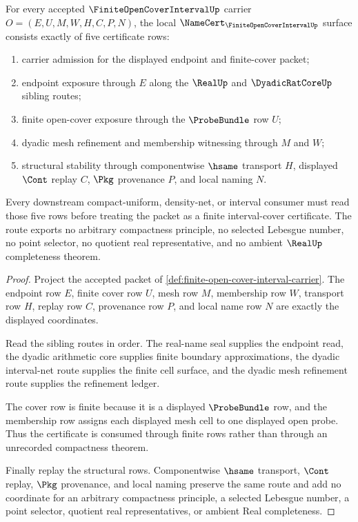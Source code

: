 \begin{theorem}
\label{thm:finite-open-cover-interval-obligations}
For every accepted $\FiniteOpenCoverIntervalUp$ carrier $O=(E,U,M,W,H,C,P,N)$, the local $\NameCert_{\FiniteOpenCoverIntervalUp}$ surface consists exactly of five certificate rows:
\begin{enumerate}
\item carrier admission for the displayed endpoint and finite-cover packet;
\item endpoint exposure through $E$ along the $\RealUp$ and $\DyadicRatCoreUp$ sibling routes;
\item finite open-cover exposure through the $\ProbeBundle$ row $U$;
\item dyadic mesh refinement and membership witnessing through $M$ and $W$;
\item structural stability through componentwise $\hsame$ transport $H$, displayed $\Cont$ replay $C$, $\Pkg$ provenance $P$, and local naming $N$.
\end{enumerate}
Every downstream compact-uniform, density-net, or interval consumer must read those five rows before treating the packet as a finite interval-cover certificate. The route exports no arbitrary compactness principle, no selected Lebesgue number, no point selector, no quotient real representative, and no ambient $\RealUp$ completeness theorem.
\end{theorem}
\begin{proof}
Project the accepted packet of \autoref{def:finite-open-cover-interval-carrier}. The endpoint row $E$, finite cover row $U$, mesh row $M$, membership row $W$, transport row $H$, replay row $C$, provenance row $P$, and local name row $N$ are exactly the displayed coordinates.

Read the sibling routes in order. The real-name seal supplies the endpoint read, the dyadic arithmetic core supplies finite boundary approximations, the dyadic interval-net route supplies the finite cell surface, and the dyadic mesh refinement route supplies the refinement ledger.

The cover row is finite because it is a displayed $\ProbeBundle$ row, and the membership row assigns each displayed mesh cell to one displayed open probe. Thus the certificate is consumed through finite rows rather than through an unrecorded compactness theorem.

Finally replay the structural rows. Componentwise $\hsame$ transport, $\Cont$ replay, $\Pkg$ provenance, and local naming preserve the same route and add no coordinate for an arbitrary compactness principle, a selected Lebesgue number, a point selector, quotient real representatives, or ambient Real completeness.
\end{proof}

